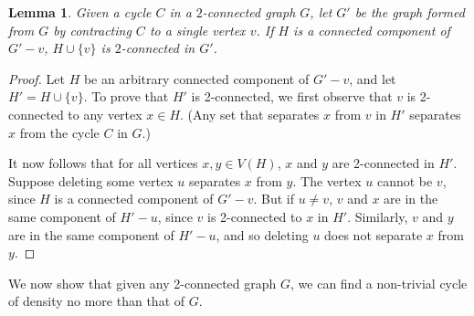 \documentclass[11pt]{article}
\newtheorem{lemma}{Lemma}[section]
\begin{document}
\begin{lemma}\label{lem:2connComp}
  Given a cycle $C$ in a $2$-connected graph $G$, let $G'$ be the graph
  formed from $G$ by contracting $C$ to a single vertex $v$. If $H$ is
  a connected component of $G' - v$, $H \cup \{v\}$ is $2$-connected in
  $G'$.
\end{lemma}
\begin{proof}
  Let $H$ be an arbitrary connected component of $G' - v$, and let $H'
  = H \cup \{v\}$. To prove that $H'$ is 2-connected, we first observe
  that $v$ is 2-connected to any vertex $x \in H$. (Any set that
  separates $x$ from $v$ in $H'$ separates $x$ from the cycle $C$ in
  $G$.)

  It now follows that for all vertices $x,y \in V(H)$, $x$ and $y$ are
  2-connected in $H'$. Suppose deleting some vertex $u$ separates $x$
  from $y$. The vertex $u$ cannot be $v$, since $H$ is a connected
  component of $G' - v$. But if $u \neq v$, $v$ and $x$ are in the
  same component of $H' - u$, since $v$ is 2-connected to $x$ in
  $H'$. Similarly, $v$ and $y$ are in the same component of $H' - u$,
  and so deleting $u$ does not separate $x$ from $y$.
\end{proof}

We now show that given any 2-connected graph $G$, we can find a
non-trivial cycle of density no more than that of $G$.
\end{document}
